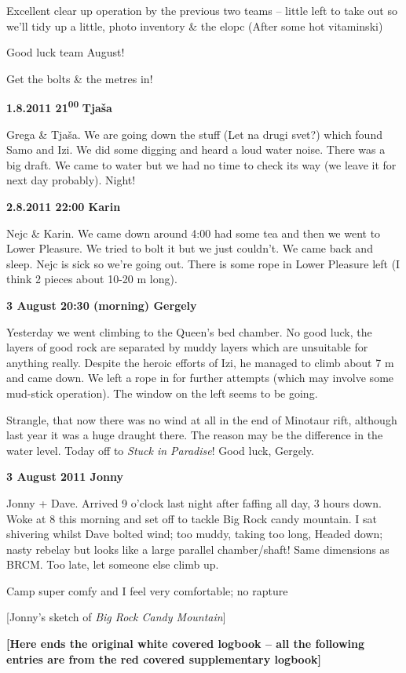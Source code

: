 Excellent clear up operation by the previous two teams -- little left to
take out so we'll tidy up a little, photo inventory \& the elopc (After
some hot vitaminski)

Good luck team August!

Get the bolts \& the metres in!

\textbf{1.8.2011 21\textsuperscript{00}} \textbf{Tjaša}

Grega \& Tjaša. We are going down the stuff (Let na drugi svet?) which
found Samo and Izi. We did some digging and heard a loud water noise.
There was a big draft. We came to water but we had no time to check its
way (we leave it for next day probably). Night!

\textbf{2.8.2011 22:00 Karin}

Nejc \& Karin. We came down around 4:00 had some tea and then we went to
Lower Pleasure. We tried to bolt it but we just couldn't. We came back
and sleep. Nejc is sick so we're going out. There is some rope in Lower
Pleasure left (I think 2 pieces about 10-20 m long).

\textbf{3 August 20:30 (morning) Gergely}

Yesterday we went climbing to the Queen's bed chamber. No good luck, the
layers of good rock are separated by muddy layers which are unsuitable
for anything really. Despite the heroic efforts of Izi, he managed to
climb about 7 m and came down. We left a rope in for further attempts
(which may involve some mud-stick operation). The window on the left
seems to be going.

Strangle, that now there was no wind at all in the end of Minotaur rift,
although last year it was a huge draught there. The reason may be the
difference in the water level. Today off to \emph{Stuck in Paradise}!
Good luck, Gergely.

\textbf{3 August 2011 Jonny}

Jonny + Dave. Arrived 9 o'clock last night after faffing all day, 3
hours down. Woke at 8 this morning and set off to tackle Big Rock candy
mountain. I sat shivering whilst Dave bolted wind; too muddy, taking too
long, Headed down; nasty rebelay but looks like a large parallel
chamber/shaft! Same dimensions as BRCM. Too late, let someone else climb
up.

Camp super comfy and I feel very comfortable; no rapture

{[}Jonny's sketch of \emph{Big Rock Candy Mountain}{]}

\textbf{{[}Here ends the original white covered logbook -- all the
following entries are from the red covered supplementary logbook{]}}


